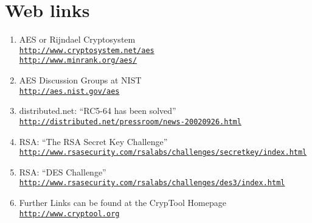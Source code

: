 \newpage
\section*{Web links}

\begin{enumerate}

\item AES or Rijndael Cryptosystem \\
        \href{http://www.cryptosystem.net/aes}
         {\tt http://www.cryptosystem.net/aes} \\
	\href{http://www.minrank.org/aes/}
         {\tt http://www.minrank.org/aes/}

  \item AES Discussion Groups at NIST \\
	\href{http://aes.nist.gov/aes}{\tt http://aes.nist.gov/aes}

  \item distributed.net: ``RC5-64 has been solved'' \\
        \href{http://distributed.net/pressroom/news-20020926.html}
         {\tt http://distributed.net/pressroom/news-20020926.html}

  \item RSA: ``The RSA Secret Key Challenge'' \\
      \href{http://www.rsasecurity.com/rsalabs/challenges/secretkey/index.html}
       {\tt http://www.rsasecurity.com/rsalabs/challenges/secretkey/index.html}

  \item RSA: ``DES Challenge'' \\
        \href{http://www.rsasecurity.com/rsalabs/challenges/des3/index.html}
         {\tt http://www.rsasecurity.com/rsalabs/challenges/des3/index.html}

  \item Further Links can be found at the CrypTool Homepage \\
        \href{http://www.cryptool.org}
         {\tt http://www.cryptool.org}
	       
\end{enumerate}



